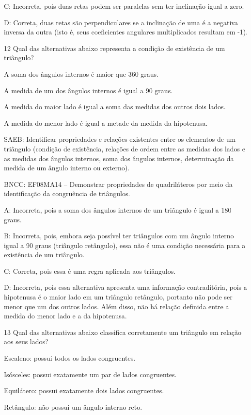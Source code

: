 {C: Incorreta, pois duas retas podem ser paralelas sem ter inclinação
igual a zero.

D: Correta, duas retas são perpendiculares se a inclinação de uma é a
negativa inversa da outra (isto é, seus coeficientes angulares
multiplicados resultam em -1).

\num{12} Qual das alternativas abaixo representa a condição de existência de
um triângulo?
\item A soma dos ângulos internos é maior que 360 graus.
\item A medida de um dos ângulos internos é igual a 90 graus.
\item A medida do maior lado é igual a soma das medidas dos outros dois
lados.
\item A medida do menor lado é igual a metade da medida da hipotenusa.

SAEB: Identificar propriedades e relações existentes entre os elementos
de um triângulo (condição de existência, relações de ordem entre as
medidas dos lados e as medidas dos ângulos internos, soma dos ângulos
internos, determinação da medida de um ângulo interno ou externo).

BNCC: EF08MA14 -- Demonstrar propriedades de quadriláteros por meio da
identificação da congruência de triângulos.

A: Incorreta, pois a soma dos ângulos internos de um triângulo é igual a
180 graus.

B: Incorreta, pois, embora seja possível ter triângulos com um ângulo
interno igual a 90 graus (triângulo retângulo), essa não é uma condição
necessária para a existência de um triângulo.

C: Correta, pois essa é uma regra aplicada aos triângulos.

D: Incorreta, pois essa alternativa apresenta uma informação
contraditória, pois a hipotenusa é o maior lado em um triângulo
retângulo, portanto não pode ser menor que um dos outros lados. Além
disso, não há relação definida entre a medida do menor lado e a da
hipotenusa.

\num{13} Qual das alternativas abaixo classifica corretamente um triângulo em
relação aos seus lados?
\item Escaleno: possui todos os lados congruentes.
\item Isósceles: possui exatamente um par de lados congruentes.
\item Equilátero: possui exatamente dois lados congruentes.
\item Retângulo: não possui um ângulo interno reto.

}
